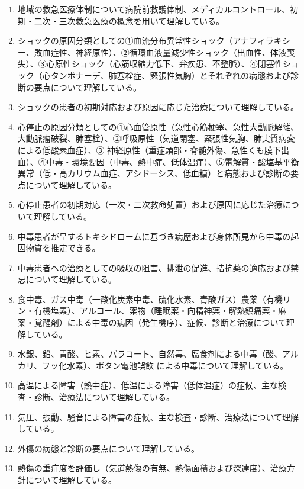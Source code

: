 \begin{enumerate}
\def\labelenumi{\arabic{enumi}.}
\tightlist
\item
  地域の救急医療体制について病院前救護体制、メディカルコントロール、初期・二次・三次救急医療の概念を用いて理解している。
\item
  ショックの原因分類としての①血流分布異常性ショック（アナフィラキシー、敗血症性、神経原性）、②循環血液量減少性ショック（出血性、体液喪失）、③心原性ショック（心筋収縮力低下、弁疾患、不整脈）、④閉塞性ショック（心タンポナーデ、肺塞栓症、緊張性気胸）とそれぞれの病態および診断の要点について理解している。
\item
  ショックの患者の初期対応および原因に応じた治療について理解している。
\item
  心停止の原因分類としての①心血管原性（急性心筋梗塞、急性大動脈解離、大動脈瘤破裂、肺塞栓）、②呼吸原性（気道閉塞、緊張性気胸、肺実質病変による低酸素血症）、③
  神経原性（重症頭部・脊髄外傷、急性くも膜下出血）、④中毒・環境要因（中毒、熱中症、低体温症）、⑤電解質・酸塩基平衡異常（低・高カリウム血症、アシドーシス、低血糖）と病態および診断の要点について理解している。
\item
  心停止患者の初期対応（一次・二次救命処置）および原因に応じた治療について理解している。
\item
  中毒患者が呈するトキシドロームに基づき病歴および身体所見から中毒の起因物質を推定できる。
\item
  中毒患者への治療としての吸収の阻害、排泄の促進、拮抗薬の適応および禁忌について理解している。
\item
  食中毒、ガス中毒（一酸化炭素中毒、硫化水素、青酸ガス）農薬（有機リン・有機塩素）、アルコール、薬物（睡眠薬・向精神薬・解熱鎮痛薬・麻薬・覚醒剤）による中毒の病因（発生機序）、症候、診断と治療について理解している。
\item
  水銀、鉛、青酸、ヒ素、パラコート、自然毒、腐食剤による中毒（酸、アルカリ、フッ化水素）、ボタン電池誤飲
  による中毒について理解している。
\item
  高温による障害（熱中症）、低温による障害（低体温症）の症候、主な検査・診断、治療法について理解している。
\item
  気圧、振動、騒音による障害の症候、主な検査・診断、治療法について理解している。
\item
  外傷の病態と診断の要点について理解している。
\item
  熱傷の重症度を評価し（気道熱傷の有無、熱傷面積および深達度）、治療方針について理解している。
\end{enumerate}


